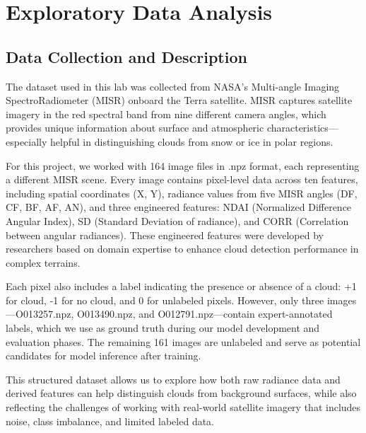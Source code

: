\documentclass[11pt,letterpaper]{article}
\begin{document}
\newpage
\vspace{1em} %
\section{Exploratory Data Analysis}

\vspace{1em} %
\subsection{Data Collection and Description}
\vspace{0.5em} %

The dataset used in this lab was collected from NASA’s Multi-angle Imaging SpectroRadiometer (MISR) onboard the Terra satellite. MISR captures satellite imagery in the red spectral band from nine different camera angles, which provides unique information about surface and atmospheric characteristics—especially helpful in distinguishing clouds from snow or ice in polar regions.

For this project, we worked with 164 image files in .npz format, each representing a different MISR scene. Every image contains pixel-level data across ten features, including spatial coordinates (X, Y), radiance values from five MISR angles (DF, CF, BF, AF, AN), and three engineered features: NDAI (Normalized Difference Angular Index), SD (Standard Deviation of radiance), and CORR (Correlation between angular radiances). These engineered features were developed by researchers based on domain expertise to enhance cloud detection performance in complex terrains.

Each pixel also includes a label indicating the presence or absence of a cloud: +1 for cloud, -1 for no cloud, and 0 for unlabeled pixels. However, only three images—O013257.npz, O013490.npz, and O012791.npz—contain expert-annotated labels, which we use as ground truth during our model development and evaluation phases. The remaining 161 images are unlabeled and serve as potential candidates for model inference after training.

This structured dataset allows us to explore how both raw radiance data and derived features can help distinguish clouds from background surfaces, while also reflecting the challenges of working with real-world satellite imagery that includes noise, class imbalance, and limited labeled data.

\vspace{1em} %
\end{document}
